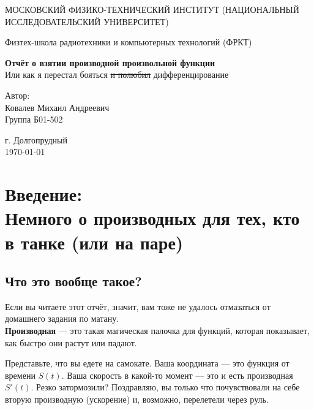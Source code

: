 \documentclass[a4paper,12pt]{article}
\begin{document}
\begin{titlepage}
	\begin{center}
		{\large МОСКОВСКИЙ ФИЗИКО-ТЕХНИЧЕСКИЙ ИНСТИТУТ (НАЦИОНАЛЬНЫЙ ИССЛЕДОВАТЕЛЬСКИЙ УНИВЕРСИТЕТ)}
	\end{center}
	\begin{center}
		{\large Физтех-школа радиотехники и компьютерных технологий (ФРКТ)}
	\end{center}


	\vspace{4.5cm}
	{\huge
		\begin{center}
			{\bf Отчёт о взятии производной произвольной функции}\\
			\large {Или как я перестал бояться \sout{и полюбил} дифференцирование}
		\end{center}
	}
	\vspace{2cm}
	\begin{flushright}
		{\LARGE Автор: \\ Ковалев Михаил Андреевич \\
			\vspace{0.2cm}
			Группа Б01-502}
	\end{flushright}
	\vspace{8cm}
	\begin{center}
		г. Долгопрудный\\
		\today
	\end{center}
\end{titlepage}

\section*{Введение: \\Немного о производных для тех, кто в танке (или на паре)}

\subsection*{Что это вообще такое?}

Если вы читаете этот отчёт, значит, вам тоже не удалось отмазаться от домашнего задания по матану. \\\textbf{Производная} — это такая магическая палочка для функций, которая показывает, как быстро они растут или падают.

Представьте, что вы едете на самокате. Ваша координата — это функция от времени $S(t)$. Ваша скорость в какой-то момент — это и есть производная $S'(t)$. Резко затормозили? Поздравляю, вы только что почувствовали на себе вторую производную (ускорение) и, возможно, перелетели через руль.
\end{document}
